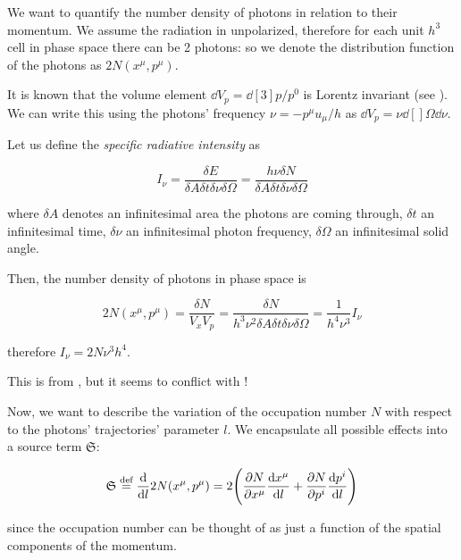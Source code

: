 \documentclass[main.tex]{subfiles}
\begin{document}
We want to quantify the number density of photons in relation to their momentum. We assume the radiation in unpolarized, therefore for each unit \(h^3\) cell in phase space there can be 2 photons: so we denote the distribution function of the photons as \(2N (x^\mu, p^\mu)\).

It is known that the volume element \(\dd{V}_p = \dd[3]{p} / p^0 \) is Lorentz invariant (see \cite[box 22.5]{MisnerThorneWheeler:1973}).
We can write this using the photons' frequency \(\nu = - p^\mu u_\mu / h\) as \(\dd{V}_p = \nu \dd[]{\Omega} \dd{\nu} \).

Let us define the \emph{specific radiative intensity} as

\begin{equation}
  I_\nu = \frac{\delta E}{\delta A \delta  t \delta \nu \delta \Omega}
  = \frac{h \nu \delta N}{\delta A \delta  t \delta \nu \delta \Omega}
\end{equation}

where \(\delta A\) denotes an infinitesimal area the photons are coming through, \(\delta t\) an infinitesimal time, \(\delta \nu\) an infinitesimal photon frequency, \(\delta \Omega\) an infinitesimal solid angle.

Then, \cite[figure 22.2]{MisnerThorneWheeler:1973} the number density of photons in phase space is

\begin{equation}
  2N(x^\mu, p^\mu) = \frac{\delta N}{V_x V_p} =  \frac{\delta N}{h^3 \nu^2\delta A \delta  t \delta \nu \delta \Omega} = \frac{1}{h^4 \nu^3} I_\nu
\end{equation}

therefore \(I_\nu = 2 N \nu^3 h^4\).

\begin{greenbox}
  This is from \cite[figure 22.2]{MisnerThorneWheeler:1973}, but it seems to conflict with \cite[equation 6.2]{Thorne:1981feb}!
\end{greenbox}

Now, we want to describe the variation of the occupation number \(N\) with respect to the photons' trajectories' parameter \(l\). We encapsulate all possible effects into a source term \(\mathfrak S\):

\begin{equation}
    \mathfrak S \stackrel{\text{def}}{=} \dv{}{l} 2N(x^\mu, p^\mu) =
    2 \qty(\pdv{N}{x^\mu} \dv{x^\mu}{l} + \pdv{N}{p^i} \dv{p^i}{l}  )
\end{equation}

since the occupation number can be thought of as just a function of the spatial components of the momentum.
\end{document}
